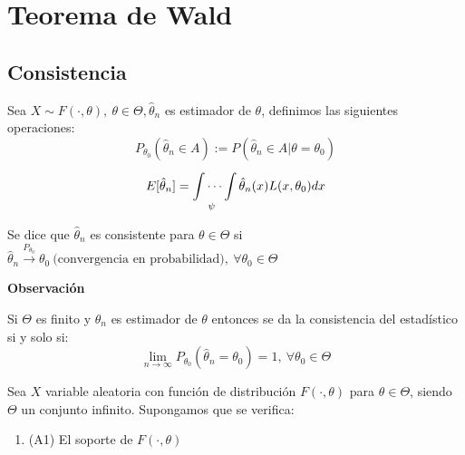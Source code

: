 \documentclass[openany]{book}
\begin{document}






\section*{Teorema de Wald}

 \subsection*{Consistencia}
 Sea $ X \sim F(\cdot ,\theta),\ \theta \in \Theta, \hat{\theta}_n $ es estimador de $ \theta $, definimos las siguientes operaciones:
 $$ P_{\theta_0}(\hat{\theta}_n \in A ) := P(\hat{\theta}_n\in A| \theta = \theta_0) $$
$$ E[\hat{\theta}_n] = \idotsint\limits_{\psi}^{}\hat{\theta}_n(x)L(x,\theta_0)dx $$

Se dice que $ \hat{\theta}_n $ es consistente para $ \theta \in \Theta $ si $ \hat{\theta}_n\xrightarrow{P_{\theta_0}} \theta_0\ \text{(convergencia en probabilidad)},\ \forall \theta_0 \in \Theta $

\begin{flushright}
    \textbf{Observación}
\end{flushright}

Si $ \Theta $ es finito y $ \hat{\theta}_n $ es estimador de $ \theta $ entonces se da la consistencia del estadístico si y solo si:
$$ \lim_{n \to \infty}P_{\theta_0}(\hat{\theta}_n=\theta_0)=1,\ \forall \theta_0 \in \Theta $$

\begin{theorem}
    Sea $ X $ variable aleatoria con función de distribución $ F(\cdot ,\theta) $ para $ \theta \in \Theta $, siendo $ \Theta $ un conjunto infinito. Supongamos que se verifica:
    \begin{enumerate}
        \item (A1) El soporte de $ F(\cdot ,\theta) $
    \end{enumerate}
\end{theorem}
\end{document}
